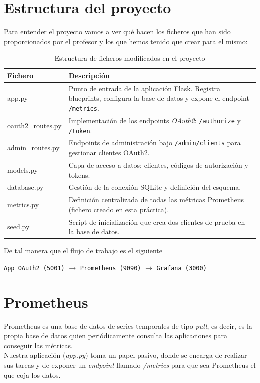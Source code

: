 \documentclass[12pt, a4paper]{article}
\begin{document}
	\section{Estructura del proyecto}
	Para entender el proyecto vamos a ver qué hacen los ficheros que han sido proporcionados por el profesor y los que hemos tenido que crear para el mismo:
	\begin{table}[H]
		\centering
		\begin{tabular}{>{\ttfamily}lp{9cm}}
			\toprule
			\textbf{Fichero} & \textbf{Descripción} \\
			\midrule
			app.py & Punto de entrada de la aplicación Flask. Registra blueprints, configura la base de datos y expone el endpoint \texttt{/metrics}. \\
			oauth2\_routes.py & Implementación de los endpoints \textit{OAuth2}: \texttt{/authorize} y \texttt{/token}. \\
			admin\_routes.py & Endpoints de administración bajo \texttt{/admin/clients} para gestionar clientes OAuth2. \\
			models.py & Capa de acceso a datos: clientes, códigos de autorización y tokens. \\
			database.py & Gestión de la conexión SQLite y definición del esquema. \\
			metrics.py & Definición centralizada de todas las métricas Prometheus (fichero creado en esta práctica). \\
			seed.py & Script de inicialización que crea dos clientes de prueba en la base de datos. \\
			\bottomrule
		\end{tabular}
		\caption{Estructura de ficheros modificados en el proyecto}
	\end{table}
	
	De tal manera que  el flujo de trabajo es el siguiente
	\begin{center}
		\texttt{App OAuth2 (5001)} $\rightarrow$ \texttt{Prometheus (9090)} $\rightarrow$ \texttt{Grafana (3000)}
	\end{center}
	\newpage
	\section{Prometheus}\label{PO}
	
	Prometheus es una base de datos de series temporales de tipo \textit{pull}, es decir, es la propia base de datos quien periódicamente consulta las aplicaciones para conseguir las métricas.\\
	Nuestra aplicación (\textit{app.py}) toma  un papel pasivo, donde  se encarga de realizar sus tareas y de exponer un \textit{endpoint} llamado \textit{/metrics} para que sea Prometheus el que coja los datos.
\end{document}
